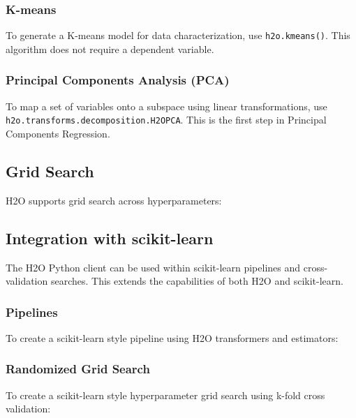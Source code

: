 {

\newpage
\subsubsection{K-means}
To generate a K-means model for data characterization, use
{\texttt{h2o.kmeans()}}. This algorithm does not require a
dependent variable.



\subsubsection{Principal Components Analysis (PCA)}
To map a set of variables onto a subspace using linear
transformations, use {\texttt{h2o.transforms.decomposition.H2OPCA}}.
This is the first step in Principal Components Regression.


\newpage

\subsection{Grid Search}
H2O supports grid search across hyperparameters:




\subsection{Integration with scikit-learn}
The H2O Python client can be used within scikit-learn pipelines and cross-validation searches.  This extends the capabilities of both H2O and scikit-learn.
\subsubsection{Pipelines}

To create a scikit-learn style pipeline using H2O transformers and estimators:



\subsubsection{Randomized Grid Search}
To create a scikit-learn style hyperparameter grid search using k-fold cross validation:




}
